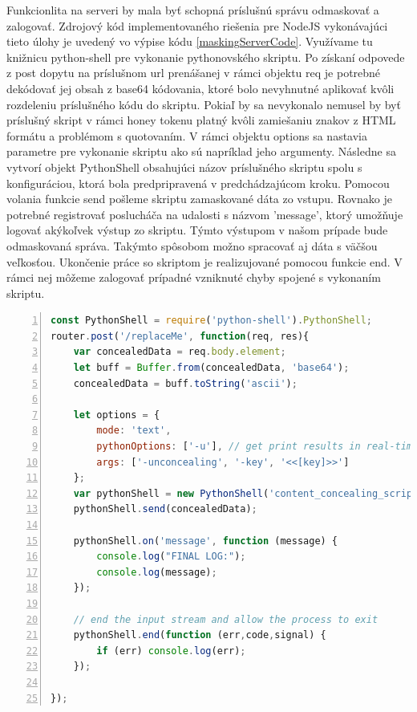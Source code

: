 \documentclass[conference, 11pt,slovak,a4paper,twoside]{IEEEtran}
\begin{document}
Funkcionlita na serveri by mala byť schopná príslušnú správu odmaskovať a zalogovať. Zdrojový kód implementovaného riešenia pre NodeJS vykonávajúci tieto úlohy je uvedený vo výpise kódu \ref{maskingServerCode}. Využívame tu knižnicu python-shell pre vykonanie pythonovského skriptu. Po získaní odpovede z post dopytu na príslušnom url prenášanej v rámci objektu req je potrebné dekódovať jej obsah z base64 kódovania, ktoré bolo nevyhnutné aplikovať kvôli rozdeleniu príslušného kódu do skriptu. Pokiaľ by sa nevykonalo nemusel by byť príslušný skript v rámci honey tokenu platný kvôli zamiešaniu znakov z HTML formátu a problémom s quotovaním. V rámci objektu options sa nastavia parametre pre vykonanie skriptu ako sú napríklad jeho argumenty. Následne sa vytvorí objekt PythonShell obsahujúci názov príslušného skriptu spolu s konfiguráciou, ktorá bola predpripravená v predchádzajúcom kroku. Pomocou volania funkcie send pošleme skriptu zamaskované dáta zo vstupu. Rovnako je potrebné registrovať poslucháča na udalosti s názvom 'message', ktorý umožňuje logovať akýkoľvek výstup zo skriptu. Týmto výstupom v našom prípade bude odmaskovaná správa. Takýmto spôsobom možno spracovať aj dáta s väčšou veľkosťou. Ukončenie práce so skriptom je realizujované pomocou funkcie end. V rámci nej môžeme zalogovať prípadné vzniknuté chyby spojené s vykonaním skriptu.

\begin{lstlisting}[float=t,language=JavaScript,numbers=left,caption={Logovanie obsahu - serverovská časť},label=maskingServerCode]
const PythonShell = require('python-shell').PythonShell;
router.post('/replaceMe', function(req, res){
   	var concealedData = req.body.element;
	let buff = Buffer.from(concealedData, 'base64');
	concealedData = buff.toString('ascii');

	let options = {
 		mode: 'text',
  		pythonOptions: ['-u'], // get print results in real-time
  		args: ['-unconcealing', '-key', '<<[key]>>']
	};
	var pythonShell = new PythonShell('content_concealing_script.py', options);
	pythonShell.send(concealedData);

	pythonShell.on('message', function (message) {
  		console.log("FINAL LOG:");
  		console.log(message);
	});

	// end the input stream and allow the process to exit
	pythonShell.end(function (err,code,signal) {
  		if (err) console.log(err);
	});
	
});
\end{lstlisting}
\end{document}
